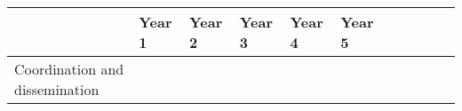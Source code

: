 
\begin{longtable}[]{@{}lllllllllll@{}}
\toprule \begin{minipage}[b]{0.07\columnwidth}\raggedright \strut \end{minipage} & \begin{minipage}[b]{0.07\columnwidth}\raggedright Year 1\strut \end{minipage} & \begin{minipage}[b]{0.07\columnwidth}\raggedright Year 2\strut \end{minipage} & \begin{minipage}[b]{0.07\columnwidth}\raggedright Year 3\strut \end{minipage} & \begin{minipage}[b]{0.07\columnwidth}\raggedright Year 4\strut \end{minipage} & \begin{minipage}[b]{0.07\columnwidth}\raggedright Year 5\strut \end{minipage} & \begin{minipage}[b]{0.07\columnwidth}\raggedright \strut \end{minipage} & \begin{minipage}[b]{0.07\columnwidth}\raggedright \strut \end{minipage} & \begin{minipage}[b]{0.07\columnwidth}\raggedright \strut \end{minipage} & \begin{minipage}[b]{0.07\columnwidth}\raggedright \strut \end{minipage} & \begin{minipage}[b]{0.07\columnwidth}\raggedright \strut \end{minipage}\tabularnewline \midrule \endhead \begin{minipage}[t]{0.07\columnwidth}\raggedright Coordination and dissemination\strut \end{minipage} & \begin{minipage}[t]{0.07\columnwidth}\raggedright \strut \end{minipage} & \begin{minipage}[t]{0.07\columnwidth}\raggedright \strut \end{minipage} & \begin{minipage}[t]{0.07\columnwidth}\raggedright \strut \end{minipage} & \begin{minipage}[t]{0.07\columnwidth}\raggedright \strut \end{minipage} & \begin{minipage}[t]{0.07\columnwidth}\raggedright \strut \end{minipage} & \begin{minipage}[t]{0.07\columnwidth}\raggedright \strut \end{minipage} & \begin{minipage}[t]{0.07\columnwidth}\raggedright \strut \end{minipage} & 
\end{longtable}
